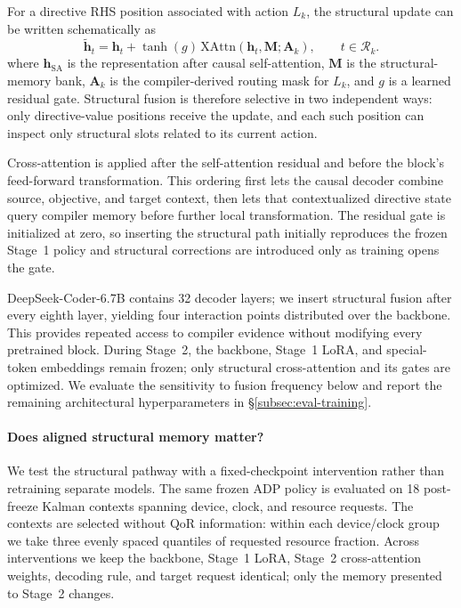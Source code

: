 For a directive RHS position associated with action $L_k$, the structural update can be written schematically as
%
\[
\tilde{\mathbf h}_t =
\mathbf h_t +
\tanh(g)\,
\mathrm{XAttn}(\mathbf h_t,\mathbf M;\mathbf A_k),
\qquad t\in\mathcal R_k .
\]
%
where $\mathbf h_{\mathrm{SA}}$ is the representation after causal self-attention, $\mathbf M$ is the structural-memory bank, $\mathbf A_k$ is the compiler-derived routing mask for $L_k$, and $g$ is a learned residual gate. Structural fusion is therefore selective in two independent ways: only directive-value positions receive the update, and each such position can inspect only structural slots related to its current action.

Cross-attention is applied after the self-attention residual and before the block's feed-forward transformation. This ordering first lets the causal decoder combine source, objective, and target context, then lets that contextualized directive state query compiler memory before further local transformation. The residual gate is initialized at zero, so inserting the structural path initially reproduces the frozen Stage~1 policy and structural corrections are introduced only as training opens the gate.

DeepSeek-Coder-6.7B contains 32 decoder layers; we insert structural fusion after every eighth layer, yielding four interaction points distributed over the backbone. This provides repeated access to compiler evidence without modifying every pretrained block. During Stage~2, the backbone, Stage~1 LoRA, and special-token embeddings remain frozen; only structural cross-attention and its gates are optimized. We evaluate the sensitivity to fusion frequency below and report the remaining architectural hyperparameters in \S\ref{subsec:eval-training}.


\paragraph{Does aligned structural memory matter?}
We test the structural pathway with a fixed-checkpoint intervention rather than retraining separate models. The same frozen ADP policy is evaluated on 18 post-freeze Kalman contexts spanning device, clock, and resource requests. The contexts are selected without QoR information: within each device/clock group we take three evenly spaced quantiles of requested resource fraction. Across interventions we keep the backbone, Stage~1 LoRA, Stage~2 cross-attention weights, decoding rule, and target request identical; only the memory presented to Stage~2 changes.


